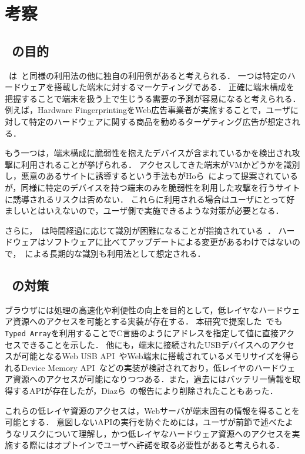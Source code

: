 \newpage
\section{考察}
\subsection{\hfp~の目的}
\hfp~は\fp~と同様の利用法の他に独自の利用例があると考えられる．
一つは特定のハードウェアを搭載した端末に対するマーケティングである．
正確に端末構成を把握することで端末を扱う上で生じうる需要の予測が容易になると考えられる．
例えば，Hardware FingerprintingをWeb広告事業者が実施することで，ユーザに対して特定のハードウェアに関する商品を勧めるターゲティング広告が想定される．

もう一つは，端末構成に脆弱性を抱えたデバイスが含まれているかを検出され攻撃に利用されることが挙げられる．
アクセスしてきた端末がVMかどうかを識別し，悪意のあるサイトに誘導するという手法もがHoら~\cite{ho2014tick}によって提案されているが，同様に特定のデバイスを持つ端末のみを脆弱性を利用した攻撃を行うサイトに誘導されるリスクは否めない．
これらに利用される場合はユーザにとって好ましいとはいえないので，ユーザ側で実施できるような対策が必要となる．

さらに，\fp~は時間経過に応じて識別が困難になることが指摘されている~\cite{磯侑斗2014web}．
ハードウェアはソフトウェアに比べてアップデートによる変更があるわけではないので，\hfp~による長期的な識別も利用法として想定される．

\subsection{\hfp~の対策}
ブラウザには処理の高速化や利便性の向上を目的として，低レイヤなハードウェア資源へのアクセスを可能とする実装が存在する．
本研究で提案した\hfp~でも\texttt{Typed Array}を利用することでC言語のようにアドレスを指定して値に直接アクセスできることを示した．
他にも，端末に接続されたUSBデバイスへのアクセスが可能となるWeb USB API~\cite{webusb}やWeb端末に搭載されているメモリサイズを得られるDevice Memory API~\cite{device_memory}などの実装が検討されており，低レイヤのハードウェア資源へのアクセスが可能になりつつある．また，過去にはバッテリー情報を取得するAPIが存在したが，Diazら~\cite{diaz2015leaking}の報告により削除されたこともあった．

これらの低レイヤ資源のアクセスは，Webサーバが端末固有の情報を得ることを可能とする．
意図しないAPIの実行を防ぐためには，ユーザが前節で述べたようなリスクについて理解し，かつ低レイヤなハードウェア資源へのアクセスを実施する際にはオプトインでユーザへ許諾を取る必要性があると考えられる．

